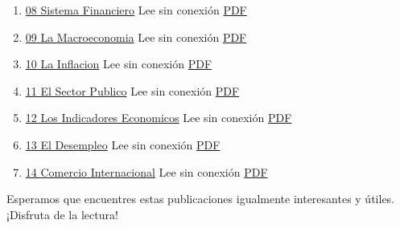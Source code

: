 \documentclass[
  jou,
  floatsintext,
  longtable,
  a4paper,
  nolmodern,
  notxfonts,
  notimes,
  colorlinks=true,linkcolor=blue,citecolor=blue,urlcolor=blue]{apa7}
\begin{document}
\begin{enumerate}
\item
  \href{https://achalmaedison.netlify.app/teching/economia-preuniversitaria/2014-02-18-08-sistema-financiero}{08
  Sistema Financiero} Lee sin conexión
  \href{https://achalmaedison.netlify.app/teching/economia-preuniversitaria/2014-02-18-08-sistema-financiero/index.pdf}{PDF}
\item
  \href{https://achalmaedison.netlify.app/teching/economia-preuniversitaria/2014-02-25-09-la-macroeconomia}{09
  La Macroeconomia} Lee sin conexión
  \href{https://achalmaedison.netlify.app/teching/economia-preuniversitaria/2014-02-25-09-la-macroeconomia/index.pdf}{PDF}
\item
  \href{https://achalmaedison.netlify.app/teching/economia-preuniversitaria/2014-03-01-10-la-inflacion}{10
  La Inflacion} Lee sin conexión
  \href{https://achalmaedison.netlify.app/teching/economia-preuniversitaria/2014-03-01-10-la-inflacion/index.pdf}{PDF}
\item
  \href{https://achalmaedison.netlify.app/teching/economia-preuniversitaria/2014-03-08-11-el-sector-publico}{11
  El Sector Publico} Lee sin conexión
  \href{https://achalmaedison.netlify.app/teching/economia-preuniversitaria/2014-03-08-11-el-sector-publico/index.pdf}{PDF}
\item
  \href{https://achalmaedison.netlify.app/teching/economia-preuniversitaria/2014-03-15-12-los-indicadores-economicos}{12
  Los Indicadores Economicos} Lee sin conexión
  \href{https://achalmaedison.netlify.app/teching/economia-preuniversitaria/2014-03-15-12-los-indicadores-economicos/index.pdf}{PDF}
\item
  \href{https://achalmaedison.netlify.app/teching/economia-preuniversitaria/2014-03-22-13-el-desempleo}{13
  El Desempleo} Lee sin conexión
  \href{https://achalmaedison.netlify.app/teching/economia-preuniversitaria/2014-03-22-13-el-desempleo/index.pdf}{PDF}
\item
  \href{https://achalmaedison.netlify.app/teching/economia-preuniversitaria/2014-03-29-14-comercio-internacional}{14
  Comercio Internacional} Lee sin conexión
  \href{https://achalmaedison.netlify.app/teching/economia-preuniversitaria/2014-03-29-14-comercio-internacional/index.pdf}{PDF}
\end{enumerate}

Esperamos que encuentres estas publicaciones igualmente interesantes y
útiles. ¡Disfruta de la lectura!
\end{document}
